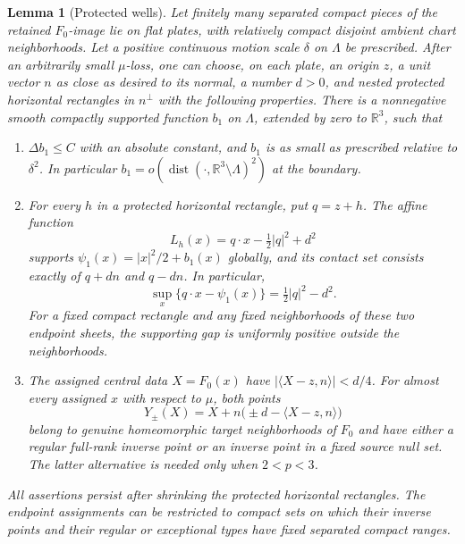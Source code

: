 \documentclass[11pt]{article}
\numberwithin{equation}{section}
\newtheorem{lemma}[theorem]{Lemma}
\theoremstyle{definition}
\theoremstyle{remark}
\newcommand{\R}{\mathbb R}
\DeclareMathOperator{\dist}{dist}
\begin{document}
\begin{lemma}[Protected wells]\label{hp:wells}
Let finitely many separated compact pieces of the retained $F_0$-image
lie on flat plates, with relatively compact disjoint ambient chart
neighborhoods.  Let a positive continuous motion scale $\delta$ on
$\Lambda$ be prescribed.  After an arbitrarily small $\mu$-loss, one can
choose, on each plate, an origin $z$, a unit vector $n$ as close as
desired to its normal, a number $d>0$, and nested protected horizontal
rectangles in $n^\perp$ with the following properties.
There is a nonnegative smooth compactly supported function $b_1$ on
$\Lambda$, extended by zero to $\R^3$, such that
\begin{enumerate}[label=\textup{(\roman*)}]
\item $\Delta b_1\leq C$ with an absolute constant, and $b_1$ is as
small as prescribed relative to $\delta^2$.  In particular
$b_1=o(\dist(\cdot,\R^3\setminus\Lambda)^2)$ at the boundary.
\item For every $h$ in a protected horizontal rectangle, put $q=z+h$.
The affine function
\[
 L_h(x)=q\cdot x-\tfrac12|q|^2+d^2
\]
supports $\psi_1(x)=|x|^2/2+b_1(x)$ globally, and its contact set
consists exactly of $q+dn$ and $q-dn$.  In particular,
\begin{equation}\label{hp:paired-dual-value}
 \sup_x\{q\cdot x-\psi_1(x)\}=\tfrac12|q|^2-d^2.
\end{equation}
For a fixed compact rectangle and any fixed neighborhoods of these
two endpoint sheets, the supporting gap is uniformly positive outside
the neighborhoods.
\item The assigned central data $X=F_0(x)$ have
$|\langle X-z,n\rangle|<d/4$.  For almost every assigned $x$ with
respect to $\mu$, both points
\begin{equation}\label{hp:sampled-endpoints}
 Y_\pm(X)=X+n\bigl(\pm d-\langle X-z,n\rangle\bigr)
\end{equation}
belong to genuine homeomorphic target neighborhoods of $F_0$ and have
either a regular full-rank inverse point or an inverse point in a fixed
source null set.  The latter alternative is needed only when $2<p<3$.
\end{enumerate}
All assertions persist after shrinking the protected horizontal
rectangles.  The endpoint assignments can be restricted to compact
sets on which their inverse points and their regular or exceptional
types have fixed separated compact ranges.
\end{lemma}
\end{document}
